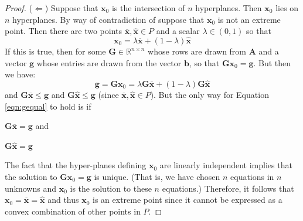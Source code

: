 \begin{proof}
($\Leftarrow$) Suppose that $\mathbf{x}_0$ is the intersection of $n$ hyperplanes. Then $\mathbf{x}_0$ lies on $n$ hyperplanes. By way of contradiction of suppose that $\mathbf{x}_0$ is not an extreme point. Then there are two points $\overline{\mathbf{x}}, \hat{\mathbf{x}} \in P$ and a scalar $\lambda \in (0,1)$ so that
\begin{displaymath}
\mathbf{x}_0 = \lambda\overline{\mathbf{x}} + (1-\lambda)\hat{\mathbf{x}}
\end{displaymath}
If this is true, then for some $\mathbf{G} \in \mathbb{R}^{n\times n}$ whose rows are drawn from $\mathbf{A}$ and a vector $\mathbf{g}$ whose entries are drawn from the vector $\mathbf{b}$, so that $\mathbf{G}\mathbf{x}_0 = \mathbf{g}$. But then we have:
\begin{equation}
\mathbf{g} = \mathbf{G}\mathbf{x}_0 = \lambda\mathbf{G}\overline{\mathbf{x}} + (1-\lambda)\mathbf{G}\hat{\mathbf{x}}
\label{eqn:gequal}
\end{equation}  
and $\mathbf{G}\overline{\mathbf{x}} \leq \mathbf{g}$ and $\mathbf{G}\hat{\mathbf{x}}\leq \mathbf{g}$ (since $\overline{\mathbf{x}}, \hat{\mathbf{x}} \in P$). But the only way for Equation \ref{eqn:gequal} to hold is if 
\begin{enumerate*}
\item $\mathbf{G}\overline{\mathbf{x}} = \mathbf{g}$ and
\item $\mathbf{G}\hat{\mathbf{x}} = \mathbf{g}$
\end{enumerate*}
The fact that the hyper-planes defining $\mathbf{x}_0$ are linearly independent implies that the solution to $\mathbf{G}\mathbf{x}_0 = \mathbf{g}$ is unique. (That is, we have chosen $n$ equations in $n$ unknowns and $\mathbf{x}_0$ is the solution to these $n$ equations.) Therefore, it follows that $\mathbf{x}_0 = \overline{\mathbf{x}}=\hat{\mathbf{x}}$ and thus $\mathbf{x}_0$ is an extreme point since it cannot be expressed as a convex combination of other points in $P$.


\end{proof}
